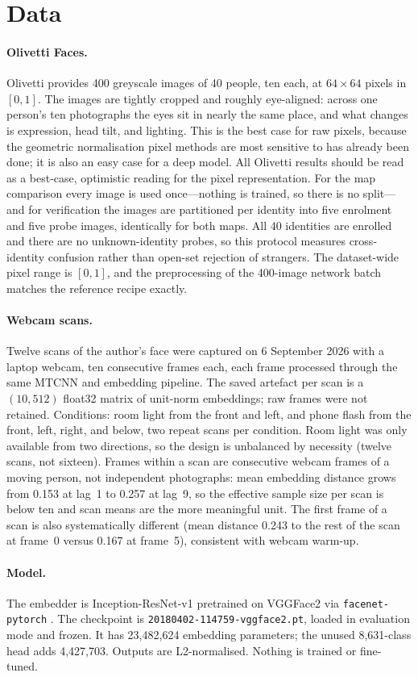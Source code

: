 \section{Data}\label{sec:data}

\paragraph{Olivetti Faces.} Olivetti \citep{samaria1994} provides 400 greyscale images of 40 people, ten each, at $64\times64$ pixels in $[0,1]$. The images are tightly cropped and roughly eye-aligned: across one person's ten photographs the eyes sit in nearly the same place, and what changes is expression, head tilt, and lighting. This is the best case for raw pixels, because the geometric normalisation pixel methods are most sensitive to has already been done; it is also an easy case for a deep model. All Olivetti results should be read as a best-case, optimistic reading for the pixel representation. For the map comparison every image is used once---nothing is trained, so there is no split---and for verification the images are partitioned per identity into five enrolment and five probe images, identically for both maps. All 40 identities are enrolled and there are no unknown-identity probes, so this protocol measures cross-identity confusion rather than open-set rejection of strangers. The dataset-wide pixel range is $[0,1]$, and the preprocessing of the 400-image network batch matches the reference recipe exactly.

\paragraph{Webcam scans.} Twelve scans of the author's face were captured on 6 September 2026 with a laptop webcam, ten consecutive frames each, each frame processed through the same MTCNN and embedding pipeline. The saved artefact per scan is a $(10,512)$ float32 matrix of unit-norm embeddings; raw frames were not retained. Conditions: room light from the front and left, and phone flash from the front, left, right, and below, two repeat scans per condition. Room light was only available from two directions, so the design is unbalanced by necessity (twelve scans, not sixteen). Frames within a scan are consecutive webcam frames of a moving person, not independent photographs: mean embedding distance grows from 0.153 at lag~1 to 0.257 at lag~9, so the effective sample size per scan is below ten and scan means are the more meaningful unit. The first frame of a scan is also systematically different (mean distance 0.243 to the rest of the scan at frame~0 versus 0.167 at frame~5), consistent with webcam warm-up.

\paragraph{Model.} The embedder is Inception-ResNet-v1 pretrained on VGGFace2 \citep{szegedy2017,cao2018} via \texttt{facenet-pytorch} \citep{facenetpytorch}. The checkpoint is \texttt{20180402-114759-\allowbreak vggface2.pt}, loaded in evaluation mode and frozen. It has 23,482,624 embedding parameters; the unused 8,631-class head adds 4,427,703. Outputs are L2-normalised. Nothing is trained or fine-tuned.
